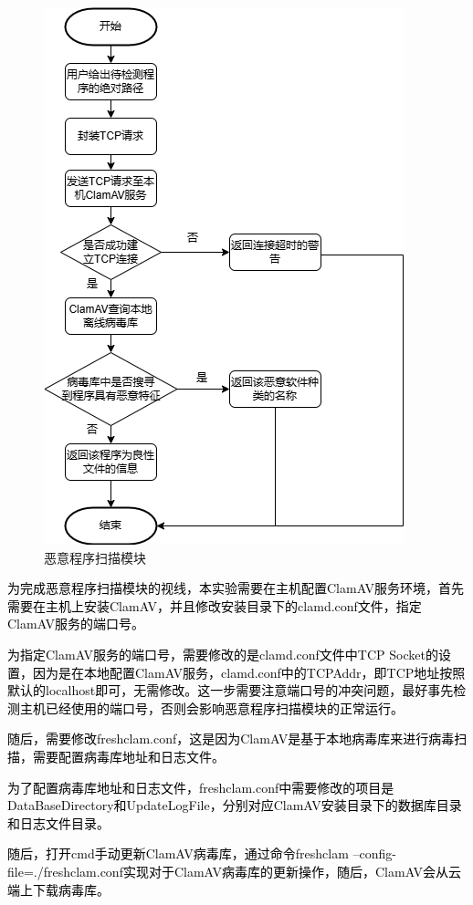 \begin{figure}
  \centering
  \includegraphics[]{images/malware_scan_module.png}
  \caption{恶意程序扫描模块}\label{fig:malware_scan_module}
\end{figure}
\textcolor{black}{为完成恶意程序扫描模块的视线，本实验需要在主机配置ClamAV服务环境，首先需要在主机上安装ClamAV，并且修改安装目录下的clamd.conf文件，指定ClamAV服务的端口号。}

\textcolor{black}{为指定ClamAV服务的端口号，需要修改的是clamd.conf文件中TCP Socket的设置，因为是在本地配置ClamAV服务，clamd.conf中的TCPAddr，即TCP地址按照默认的localhost即可，无需修改。这一步需要注意端口号的冲突问题，最好事先检测主机已经使用的端口号，否则会影响恶意程序扫描模块的正常运行。}

\textcolor{black}{随后，需要修改freshclam.conf，这是因为ClamAV是基于本地病毒库来进行病毒扫描，需要配置病毒库地址和日志文件。}

\textcolor{black}{为了配置病毒库地址和日志文件，freshclam.conf中需要修改的项目是DataBaseDirectory和UpdateLogFile，分别对应ClamAV安装目录下的数据库目录和日志文件目录。}

\textcolor{black}{随后，打开cmd手动更新ClamAV病毒库，通过命令freshclam –config-file=./freshclam.conf实现对于ClamAV病毒库的更新操作，随后，ClamAV会从云端上下载病毒库。}

